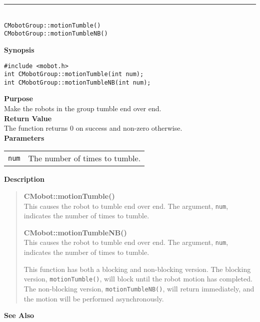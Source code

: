 \noindent
\vspace{5pt}
\rule{4.5in}{0.015in}\\
\noindent
{\LARGE \texttt{CMobotGroup::motionTumble()}}\\
{\LARGE \texttt{CMobotGroup::motionTumbleNB()}}\\
{}

\noindent
{\bf Synopsis}
\vspace{-8pt}
\begin{verbatim}
#include <mobot.h>
int CMobotGroup::motionTumble(int num);
int CMobotGroup::motionTumbleNB(int num);
\end{verbatim}

\noindent
{\bf Purpose}\\
Make the robots in the group tumble end over end.\\

\noindent
{\bf Return Value}\\
The function returns 0 on success and non-zero otherwise.\\

\noindent
{\bf Parameters}\\
\vspace{-0.1in}
\begin{description}
\item               
\begin{tabular}{p{10 mm}p{145 mm}}
\texttt{num} & The number of times to tumble. \\
\end{tabular}
\end{description}

\noindent
{\bf Description}\\
\vspace{-12pt}
\begin{quote}
{\bf CMobot::motionTumble()}\\
This causes the robot to tumble end over end. The argument, \texttt{num},
indicates the number of times to tumble.

{\bf CMobot::motionTumbleNB()}\\
This causes the robot to tumble end over end. The argument, \texttt{num},
indicates the number of times to tumble.

This function has both a blocking and non-blocking version.
The blocking version, \texttt{motionTumble()}, will block until the
robot motion has completed. The non-blocking version, \texttt{motionTumbleNB()},
will return immediately, and the motion will be performed asynchronously.\\
\end{quote}

\noindent
{\bf See Also}\\

